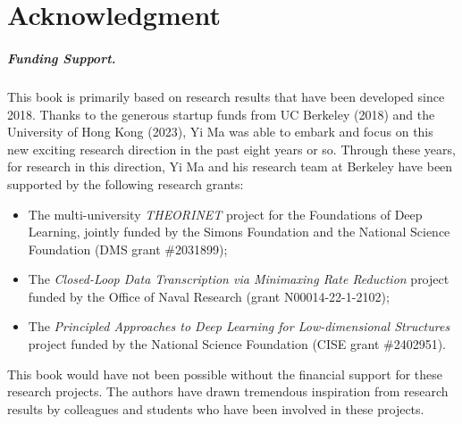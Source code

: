 \documentclass[../../book-main.tex]{subfiles}
\begin{document}
\chapter*{Acknowledgment}

\paragraph{Funding Support.}
This book is primarily based on research results that have been
developed since 2018. Thanks to the generous startup funds from UC Berkeley (2018) and the University of Hong Kong (2023), Yi Ma was able to embark and focus on this new exciting research direction in the past eight years or so. Through these years, for research in this direction, Yi Ma and his research team at Berkeley have
been supported by the following research grants:
\begin{itemize}
    \item The multi-university {\em THEORINET} project for the
        Foundations of Deep Learning, jointly funded by the Simons
        Foundation and the National Science Foundation (DMS grant \#2031899);
    \item The {\em Closed-Loop Data Transcription via Minimaxing Rate
        Reduction} project funded by the Office of Naval Research (grant
        N00014-22-1-2102);
    \item The {\em Principled Approaches to Deep Learning for
        Low-dimensional Structures} project funded by the National
        Science Foundation (CISE grant \#2402951).
\end{itemize}
This book would have not been possible without the financial support
for these research projects. The authors have drawn tremendous
inspiration from research results by colleagues and students who have
been involved in these projects.
\end{document}
